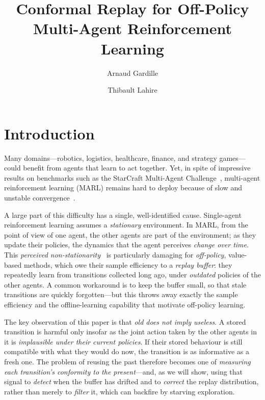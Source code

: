 \documentclass[sigconf]{aamas}
\title{Conformal Replay for Off-Policy Multi-Agent Reinforcement Learning}
\author{Arnaud Gardille}
\affiliation{%
  \institution{ENS Paris-Saclay}
  \city{Gif-sur-Yvette}
  \country{France}}
\author{Thibault Lahire}
\affiliation{%
  \institution{Dassault Aviation}
  \city{Saint-Cloud}
  \country{France}}
\begin{document}
\pagestyle{fancy}
\fancyhead{}

\maketitle

\section{Introduction}

Many domains---robotics, logistics, healthcare, finance, and strategy
games---could benefit from agents that learn to act together. Yet, in spite of
impressive results on benchmarks such as the StarCraft Multi-Agent
Challenge~\cite{samvelyan2019starcraft}, multi-agent reinforcement learning
(MARL) remains hard to deploy because of slow and unstable
convergence~\cite{matignon2012independent}.

A large part of this difficulty has a single, well-identified cause. Single-agent
reinforcement learning assumes a \emph{stationary} environment. In MARL, from the
point of view of one agent, the other agents are part of the environment; as they
update their policies, the dynamics that the agent perceives \emph{change over
time}. This \emph{perceived non-stationarity}~\cite{matignon2012independent} is
particularly damaging for \emph{off-policy}, value-based methods, which owe their
sample efficiency to a \emph{replay buffer}: they repeatedly learn from
transitions collected long ago, under \emph{outdated} policies of the other
agents. A common workaround is to keep the buffer small, so that stale
transitions are quickly forgotten---but this throws away exactly the sample
efficiency and the offline-learning capability that motivate off-policy learning.

The key observation of this paper is that \emph{old does not imply useless}. A
stored transition is harmful only insofar as the joint action taken by the other
agents in it is \emph{implausible under their current policies}. If their stored
behaviour is still compatible with what they would do now, the transition is as
informative as a fresh one. The problem of reusing the past therefore becomes one
of \emph{measuring each transition's conformity to the present}---and, as we will
show, using that signal to \emph{detect} when the buffer has drifted and to
\emph{correct} the replay distribution, rather than merely to \emph{filter} it,
which can backfire by starving exploration.
\end{document}
